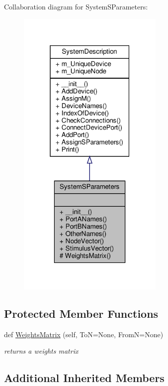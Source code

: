 Collaboration diagram for System\+S\+Parameters\+:
\nopagebreak
\begin{figure}[H]
\begin{center}
\leavevmode
\includegraphics[width=199pt]{classSignalIntegrity_1_1SystemDescriptions_1_1SystemSParameters_1_1SystemSParameters__coll__graph}
\end{center}
\end{figure}
\subsection*{Protected Member Functions}
\begin{DoxyCompactItemize}
\item 
def \hyperlink{classSignalIntegrity_1_1SystemDescriptions_1_1SystemSParameters_1_1SystemSParameters_a60ce3b270f6f66dd0e2fb9f64629f8e6}{Weights\+Matrix} (self, ToN=None, FromN=None)
\begin{DoxyCompactList}\small\item\em returns a weights matrix \end{DoxyCompactList}\end{DoxyCompactItemize}
\subsection*{Additional Inherited Members}


